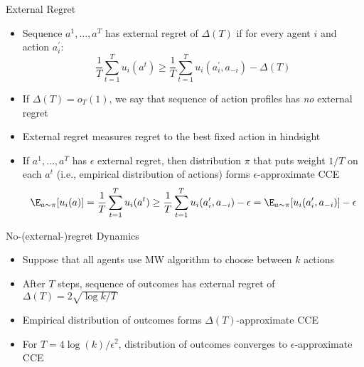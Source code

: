 \documentclass[11pt,aspectratio=169,handout]{beamer}
\begin{document}
  
  \begin{frame}{External Regret}
   \begin{itemize}[<+->]
    \item Sequence $a^1,\dots,a^T$ has \alert{external regret} of $\Delta(T)$ if for every agent $i$ and action $a_i^\prime$:
    $$\frac{1}{T}\sum_{t=1}^T u_i(a^t) \geq \frac{1}{T} \sum_{t=1}^T u_i(a_i^\prime,a_{-i}) - \Delta(T)$$
    \item If $\Delta(T) = o_T(1)$, we say that sequence of action profiles has \emph{no} external regret
    \item External regret measures regret to the best \alert{fixed} action in hindsight
    \item If $a^1,\dots,a^T$ has $\epsilon$ external regret, then distribution $\pi$ that puts weight $1/T$ on each $a^t$ (i.e., empirical distribution of actions) forms \alert{$\epsilon$-approximate CCE}
    $$\E_{a\sim \pi}[u_i(a)] = \frac{1}{T}\sum_{t=1}^T u_i(a^t) \ge \frac{1}{T}\sum_{t=1}^T u_i(a_i^\prime,a_{-i}) - \epsilon = \E_{a\sim \pi}[u_i(a_i^\prime, a_{-i})] - \epsilon$$
   \end{itemize}
  \end{frame}
  
  
  \begin{frame}{No-(external-)regret Dynamics}
   \begin{itemize}[<+->]
   \setlength{\itemsep}{1.5em}
    \item Suppose that all agents use MW algorithm to choose between $k$ actions
    \item After $T$ steps, sequence of outcomes has external regret of $\Delta(T) = 2\sqrt{\log k/T}$
    \item Empirical distribution of outcomes forms $\Delta(T)$-approximate CCE
    \item For $T = 4\log(k)/\epsilon^2$, distribution of outcomes converges to $\epsilon$-approximate CCE
   \end{itemize}
  \end{frame}
  
\end{document}
